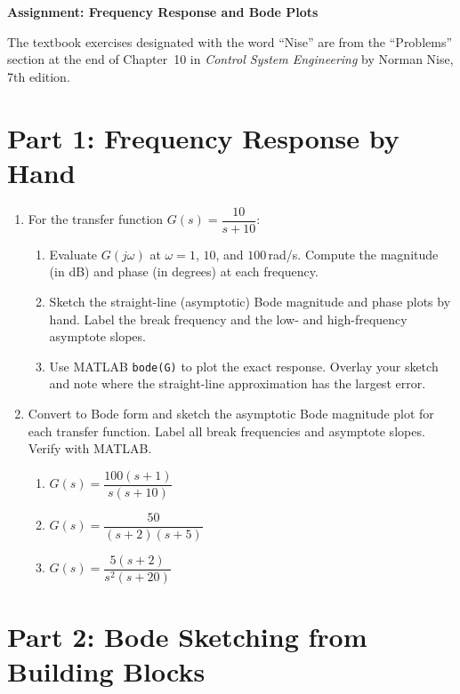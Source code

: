 \documentclass[11pt]{article}
\begin{document}
\begin{center}
  \Large{\bf{Assignment: Frequency Response and Bode Plots}}
\end{center}

The textbook exercises designated with the word ``Nise'' are from the
``Problems'' section at the end of Chapter~10 in \emph{Control System
Engineering} by Norman Nise, 7th edition.

\section*{Part 1: Frequency Response by Hand}

\begin{enumerate}

\item For the transfer function $G(s) = \dfrac{10}{s + 10}$:
  \begin{enumerate}
    \item Evaluate $G(j\omega)$ at $\omega = 1$, $10$, and $100$\,rad/s.
      Compute the magnitude (in dB) and phase (in degrees) at each frequency.
    \item Sketch the straight-line (asymptotic) Bode magnitude and phase plots
      by hand.  Label the break frequency and the low- and high-frequency
      asymptote slopes.
    \item Use MATLAB \texttt{bode(G)} to plot the exact response.  Overlay your
      sketch and note where the straight-line approximation has the largest
      error.
  \end{enumerate}

\item Convert to Bode form and sketch the asymptotic Bode magnitude plot for
  each transfer function.  Label all break frequencies and asymptote slopes.
  Verify with MATLAB.

  \begin{enumerate}
    \item $G(s) = \dfrac{100(s+1)}{s(s+10)}$
    \item $G(s) = \dfrac{50}{(s+2)(s+5)}$
    \item $G(s) = \dfrac{5(s+2)}{s^2(s+20)}$
  \end{enumerate}

\end{enumerate}

\section*{Part 2: Bode Sketching from Building Blocks}
\end{document}
